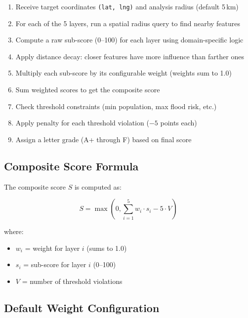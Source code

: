 \documentclass[12pt, a4paper]{article}
\begin{document}
\begin{enumerate}[leftmargin=2em]
    \item Receive target coordinates \texttt{(lat, lng)} and analysis radius (default 5\,km)
    \item For each of the 5 layers, run a spatial radius query to find nearby features
    \item Compute a raw sub-score (0--100) for each layer using domain-specific logic
    \item Apply distance decay: closer features have more influence than farther ones
    \item Multiply each sub-score by its configurable weight (weights sum to 1.0)
    \item Sum weighted scores to get the composite score
    \item Check threshold constraints (min population, max flood risk, etc.)
    \item Apply penalty for each threshold violation ($-5$ points each)
    \item Assign a letter grade (A+ through F) based on final score
\end{enumerate}

\subsection{Composite Score Formula}

The composite score $S$ is computed as:

\begin{equation}
    S = \max\left(0, \sum_{i=1}^{5} w_i \cdot s_i - 5 \cdot V\right)
\end{equation}

where:
\begin{itemize}[leftmargin=2em]
    \item $w_i$ = weight for layer $i$ (sums to 1.0)
    \item $s_i$ = sub-score for layer $i$ (0--100)
    \item $V$ = number of threshold violations
\end{itemize}

\subsection{Default Weight Configuration}
\end{document}
